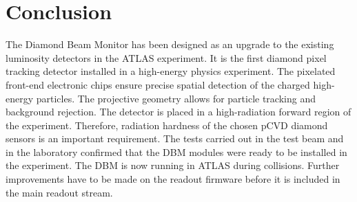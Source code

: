 \documentclass[12pt]{packages/mytustyle}  %
\begin{document}
\section{Conclusion}
\label{sec:limitations}
The Diamond Beam Monitor has been designed as an upgrade to the existing luminosity detectors in the ATLAS experiment. It is the first diamond pixel tracking detector installed in a high-energy physics experiment. The pixelated front-end electronic chips ensure precise spatial detection of the charged high-energy particles. The projective geometry allows for particle tracking and background rejection. The detector is placed in a high-radiation forward region of the experiment. Therefore, radiation hardness of the chosen pCVD diamond sensors is an important requirement. The tests carried out in the test beam and in the laboratory confirmed that the DBM modules were ready to be installed in the experiment. The DBM is now running in ATLAS during collisions. Further improvements have to be made on the readout firmware before it is included in the main readout stream. 





\end{document}
